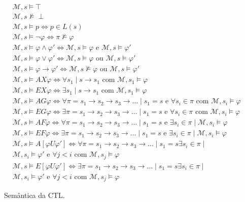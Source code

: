 \begin{figure}[H]
    \caption{Semântica da CTL.} \label{fig:ctl_sem}
	\centering
	\begin{align}
	&\mathcal{M},s  \models  \top \\
	&\mathcal{M},s  \not\models  \perp \\
	&\mathcal{M},s  \models  p \iff p \in L(s) \\
	&\mathcal{M},s  \models  \neg \varphi \iff \pi \not \models \varphi \\
	&\mathcal{M},s  \models  \varphi \wedge \varphi' \iff \mathcal{M},s \models \varphi \mbox{ e } \mathcal{M},s \models \varphi' \\
	&\mathcal{M},s  \models  \varphi \vee \varphi' \iff \mathcal{M},s \models \varphi \mbox{ ou } \mathcal{M},s \models \varphi' \\
	&\mathcal{M},s  \models  \varphi \to \varphi' \iff \mathcal{M},s \not\models \varphi \mbox{ ou } \mathcal{M},s \models \varphi' \\
	&\mathcal{M},s  \models  AX\varphi \iff \forall s_1 \mid s\to s_1 \mbox{ com } \mathcal{M}, s_1 \models \varphi \\
	&\mathcal{M},s  \models  EX\varphi \iff \exists s_1 \mid s\to s_1 \mbox{ com } \mathcal{M}, s_1 \models \varphi \\
	&\mathcal{M},s  \models  AG\varphi \iff \forall \pi = s_1\to s_2\to s_3\to \dots \mid s_1 = s \mbox{ e } \forall s_i \in \pi \mbox{ com } \mathcal{M}, s_i \models \varphi \\
	&\mathcal{M},s  \models  EG\varphi \iff \exists \pi = s_1\to s_2\to s_3\to \dots \mid s_1 = s \mbox{ e } \forall s_i \in \pi \mbox{ com } \mathcal{M}, s_i \models \varphi \\
	&\mathcal{M},s  \models  AF\varphi \iff \forall \pi = s_1\to s_2\to s_3\to \dots \mid s_1 = s \mbox{ e } \exists s_i \in \pi \mid \mathcal{M}, s_i \models \varphi \\
	&\mathcal{M},s  \models  EF\varphi \iff \exists \pi = s_1\to s_2\to s_3\to \dots \mid s_1 = s \mbox{ e } \exists s_i \in \pi \mid \mathcal{M}, s_i \models \varphi \\
	&\mathcal{M},s  \models  A[\varphi U \varphi'] \iff \forall \pi = s_1\to s_2\to s_3\to \dots \mid s_1 = s \exists s_i \in \pi \mid \\
	&\mathcal{M}, s_i \models \varphi' \mbox{ e } \forall j < i \mbox{ com }  \mathcal{M}, s_j \models \varphi \\
	&\mathcal{M},s  \models  E[\varphi U \varphi'] \iff \exists \pi = s_1\to s_2\to s_3\to \dots \mid s_1 = s \exists s_i \in \pi \mid \\
	&\mathcal{M}, s_i \models \varphi' \mbox{ e } \forall j < i \mbox{ com }  \mathcal{M}, s_j \models \varphi
	\end{align}
\end{figure}


